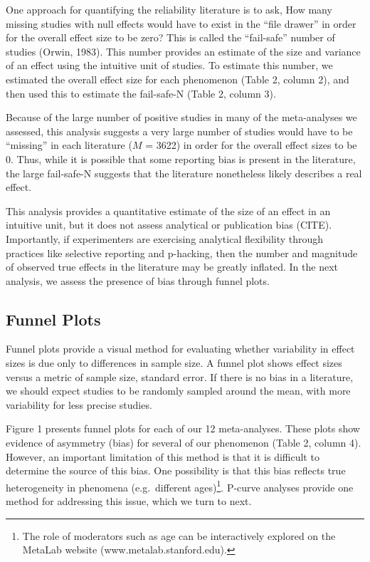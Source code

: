 \documentclass[english,floatsintext,man]{apa6}
\begin{document}
One approach for quantifying the reliability literature is to ask, How
many missing studies with null effects would have to exist in the
\enquote{file drawer} in order for the overall effect size to be zero?
This is called the \enquote{fail-safe} number of studies (Orwin, 1983).
This number provides an estimate of the size and variance of an effect
using the intuitive unit of studies. To estimate this number, we
estimated the overall effect size for each phenomenon (Table 2, column
2), and then used this to estimate the fail-safe-N (Table 2, column 3).

Because of the large number of positive studies in many of the
meta-analyses we assessed, this analysis suggests a very large number of
studies would have to be \enquote{missing} in each literature (\(M\) =
3622) in order for the overall effect sizes to be 0. Thus, while it is
possible that some reporting bias is present in the literature, the
large fail-safe-N suggests that the literature nonetheless likely
describes a real effect.

This analysis provides a quantitative estimate of the size of an effect
in an intuitive unit, but it does not assess analytical or publication
bias (CITE). Importantly, if experimenters are exercising analytical
flexibility through practices like selective reporting and p-hacking,
then the number and magnitude of observed true effects in the literature
may be greatly inflated. In the next analysis, we assess the presence of
bias through funnel plots.

\subsection{Funnel Plots}\label{funnel-plots}

Funnel plots provide a visual method for evaluating whether variability
in effect sizes is due only to differences in sample size. A funnel plot
shows effect sizes versus a metric of sample size, standard error. If
there is no bias in a literature, we should expect studies to be
randomly sampled around the mean, with more variability for less precise
studies.

Figure 1 presents funnel plots for each of our 12 meta-analyses. These
plots show evidence of asymmetry (bias) for several of our phenomenon
(Table 2, column 4). However, an important limitation of this method is
that it is difficult to determine the source of this bias. One
possibility is that this bias reflects true heterogeneity in phenomena
(e.g.~different
ages)\footnote{The role of moderators such as age can be interactively explored on the MetaLab website (www.metalab.stanford.edu).}.
P-curve analyses provide one method for addressing this issue, which we
turn to next.
\end{document}

